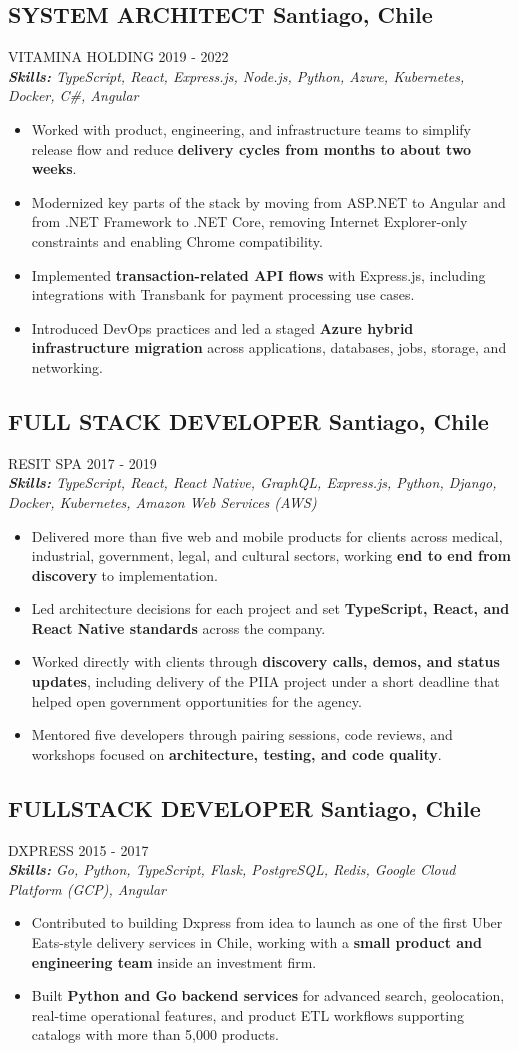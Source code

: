 \documentclass{article}
\newcommand{\WorkExperience}[2]{
   \subsection*{#1}
   \vspace{-1em}
   \uppercase{#2}
}
\newcommand{\Skills}[1]{
   \textit{\textbf{Skills:} #1}
}
\begin{document}
\WorkExperience{SYSTEM ARCHITECT \hfill Santiago, Chile}{Vitamina Holding \hfill 2019 {-} 2022} \\
\Skills{TypeScript, React, Express.js, Node.js, Python, Azure, Kubernetes, Docker, C\#, Angular}
\begin{itemize}
	\item Worked with product, engineering, and infrastructure teams to simplify release flow and reduce \textbf{delivery cycles from months to about two weeks}.
	\item Modernized key parts of the stack by moving from ASP.NET to Angular and from .NET Framework to .NET Core, removing Internet Explorer-only constraints and enabling Chrome compatibility.
	\item Implemented \textbf{transaction-related API flows} with Express.js, including integrations with Transbank for payment processing use cases.
	\item Introduced DevOps practices and led a staged \textbf{Azure hybrid infrastructure migration} across applications, databases, jobs, storage, and networking.
\end{itemize}

\WorkExperience{FULL STACK DEVELOPER \hfill Santiago, Chile}{Resit SPA \hfill 2017 {-} 2019} \\
\Skills{TypeScript, React, React Native, GraphQL, Express.js, Python, Django, Docker, Kubernetes, Amazon Web Services (AWS)}
\begin{itemize}
	\item Delivered more than five web and mobile products for clients across medical, industrial, government, legal, and cultural sectors, working \textbf{end to end from discovery} to implementation.
	\item Led architecture decisions for each project and set \textbf{TypeScript, React, and React Native standards} across the company.
	\item Worked directly with clients through \textbf{discovery calls, demos, and status updates}, including delivery of the PIIA project under a short deadline that helped open government opportunities for the agency.
	\item Mentored five developers through pairing sessions, code reviews, and workshops focused on \textbf{architecture, testing, and code quality}.
\end{itemize}

\WorkExperience{FULLSTACK DEVELOPER \hfill Santiago, Chile}{Dxpress \hfill 2015 {-} 2017} \\
\Skills{Go, Python, TypeScript, Flask, PostgreSQL, Redis, Google Cloud Platform (GCP), Angular}
\begin{itemize}
	\item Contributed to building Dxpress from idea to launch as one of the first Uber Eats-style delivery services in Chile, working with a \textbf{small product and engineering team} inside an investment firm.
	\item Built \textbf{Python and Go backend services} for advanced search, geolocation, real-time operational features, and product ETL workflows supporting catalogs with more than 5,000 products.
\end{itemize}
\end{document}
